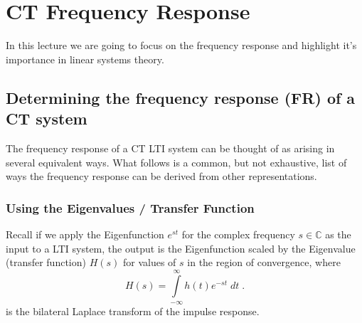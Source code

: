 \chapter{CT Frequency Response}

In this lecture we are going to focus on the frequency response and highlight it's importance in linear systems theory.

\section{Determining the frequency response (FR) of a CT system}

The frequency response of a CT LTI system can be thought of as arising in several equivalent ways. What follows is a common, but not exhaustive, list of ways the frequency response can be derived from other representations.

\subsection*{Using the Eigenvalues / Transfer Function}

Recall if we apply the Eigenfunction $e^{st}$ for the complex frequency $s \in \mathbb{C}$ as the input to a LTI system, the output is the Eigenfunction scaled by the Eigenvalue (transfer function) $H(s)$ for values of $s$ in the region of convergence, where
\[
H(s) = \int\limits_{-\infty}^{\infty} h(t) e^{-st}\; dt \; .
\]
is the bilateral Laplace transform of the impulse response.

